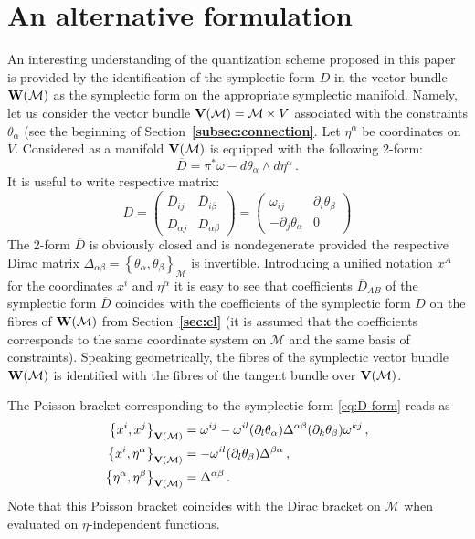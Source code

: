 \documentclass[a4paper,11pt]{amsart}
\numberwithin{thm}{section} %
\numberwithin{equation}{section} %
\numberwithin{figure}{section} %
\newcommand{\bref}[1]{{\bf \ref{#1}}}
\newcommand{\pb}[2]{\left\{{}#1{},{}#2{}\right\}}
\renewcommand{\:}{{\rm\, :\,}}
\def\bar{\overline}
\def\d{\partial}
\def\manM{{\mathcal M}}
\def\V{{\bf V}}
\def\W{{\bf W}}
\def\aD{{\bar D}}
\begin{document}
\section{An alternative formulation}\label{sec:alternative}
An interesting understanding of the quantization scheme proposed in
this paper is provided by the identification of the symplectic form
$D$ in the vector bundle $\W(\manM)$ as the symplectic form on
the appropriate symplectic manifold.  Namely, let us consider the vector
bundle $\V(\manM)=\manM \times V$ associated with the constraints
$\theta_\alpha$ (see the beginning of
Section~\bref{subsec:connection}.  Let $\eta^\alpha$ be coordinates on
$V$.  Considered as a manifold $\V(\manM)$ is equipped with the
following 2-form:
\begin{equation}
  \label{eq:D-form}
  \aD=\pi^*\omega-d \theta_\alpha \wedge d \eta^\alpha\,.
\end{equation}
It is useful to write respective matrix:
\begin{equation}
\aD=
\left(\begin{array}{cc}
\aD_{ij} & \aD_{i\beta}\\[7pt]
\aD_{\alpha j}& \aD_{\alpha\beta}
 \end{array}\right)=
\left(\begin{array}{cc}
\omega_{ij} & \d_i \theta_\beta\\[7pt]
- \d_j\theta_\alpha & 0
 \end{array}\right)
\end{equation}
The 2-form $\aD$ is obviously closed and is nondegenerate
provided the respective Dirac matrix
$\Delta_{\alpha\beta}=\pb{\theta_\alpha}{\theta_\beta}_\manM$
is invertible.  Introducing a unified notation $x^A$ for the
coordinates $x^i$ and $\eta^\alpha$ it is easy to see that
coefficients $\aD_{AB}$ of the symplectic form $\aD$ coincides with the
coefficients of the symplectic form $D$ on the fibres of $\W(\manM)$ from
Section~\bref{sec:cl} (it is assumed that the coefficients corresponds
to the same coordinate system on $\manM$ and the same basis of
constraints).  Speaking geometrically, the fibres of
the symplectic vector bundle $\W(\manM)$ is identified with the
fibres of the tangent bundle over $\V(\manM)$.


The Poisson bracket corresponding to the symplectic form
\eqref{eq:D-form} reads as
\begin{equation}
  \label{eq:D-PB}
\begin{split}
\pb{x^i}{x^j}_{\V(\manM)}&=\omega^{ij}-\omega^{il}(\d_l \theta_\alpha)
\Delta^{\alpha \beta} (\d_k \theta_\beta) \omega^{kj}\,, \\
\pb{x^i}{\eta^\alpha}_{\V(\manM)}&=-\omega^{il}(\d_l \theta_\beta)
\Delta^{\beta \alpha}\,,\\
\pb{\eta^\alpha}{\eta^\beta}_{\V(\manM)}&=\Delta^{\alpha\beta}\,.
\end{split}  
\end{equation}
Note that this Poisson bracket coincides with the Dirac
bracket on $\manM$ when evaluated on $\eta$-independent functions.
\end{document}
